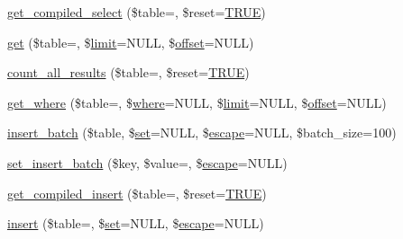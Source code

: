 \begin{DoxyCompactItemize}
\item 
\mbox{\hyperlink{class_c_i___d_b__query__builder_a23325dd8908b76e716e430b4968e3987}{get\+\_\+compiled\+\_\+select}} (\$table=\textquotesingle{}\textquotesingle{}, \$reset=\mbox{\hyperlink{constants_8php_ae04a3efe6aa42044f803ee90c2277846}{T\+R\+UE}})
\item 
\mbox{\hyperlink{class_c_i___d_b__query__builder_a02c629b7cdb54c95ccc23c21d910320d}{get}} (\$table=\textquotesingle{}\textquotesingle{}, \$\mbox{\hyperlink{class_c_i___d_b__query__builder_a875b0d4703f176c36e771d728a9a04a0}{limit}}=N\+U\+LL, \$\mbox{\hyperlink{class_c_i___d_b__query__builder_afd31b65425a2b5cf30711bf29e1b1851}{offset}}=N\+U\+LL)
\item 
\mbox{\hyperlink{class_c_i___d_b__query__builder_a2484516af4a0a9e1d84663d63aa7e505}{count\+\_\+all\+\_\+results}} (\$table=\textquotesingle{}\textquotesingle{}, \$reset=\mbox{\hyperlink{constants_8php_ae04a3efe6aa42044f803ee90c2277846}{T\+R\+UE}})
\item 
\mbox{\hyperlink{class_c_i___d_b__query__builder_a8cae750fdc32b3c91544c091673fd17b}{get\+\_\+where}} (\$table=\textquotesingle{}\textquotesingle{}, \$\mbox{\hyperlink{class_c_i___d_b__query__builder_a2356c4b7b93fb83c62a354a8a0748222}{where}}=N\+U\+LL, \$\mbox{\hyperlink{class_c_i___d_b__query__builder_a875b0d4703f176c36e771d728a9a04a0}{limit}}=N\+U\+LL, \$\mbox{\hyperlink{class_c_i___d_b__query__builder_afd31b65425a2b5cf30711bf29e1b1851}{offset}}=N\+U\+LL)
\item 
\mbox{\hyperlink{class_c_i___d_b__query__builder_ac35c8959b57eb08416e09c094371aaca}{insert\+\_\+batch}} (\$table, \$\mbox{\hyperlink{class_c_i___d_b__query__builder_a1589c46344f3a216a129cf65659b117c}{set}}=N\+U\+LL, \$\mbox{\hyperlink{class_c_i___d_b__driver_ac8f37ca5703d4558c732e692194f8cd6}{escape}}=N\+U\+LL, \$batch\+\_\+size=100)
\item 
\mbox{\hyperlink{class_c_i___d_b__query__builder_a810cdf264ad4b8df2c02c59ad3197859}{set\+\_\+insert\+\_\+batch}} (\$key, \$value=\textquotesingle{}\textquotesingle{}, \$\mbox{\hyperlink{class_c_i___d_b__driver_ac8f37ca5703d4558c732e692194f8cd6}{escape}}=N\+U\+LL)
\item 
\mbox{\hyperlink{class_c_i___d_b__query__builder_a09abce3658cfaba8d8a148c91a9be0ea}{get\+\_\+compiled\+\_\+insert}} (\$table=\textquotesingle{}\textquotesingle{}, \$reset=\mbox{\hyperlink{constants_8php_ae04a3efe6aa42044f803ee90c2277846}{T\+R\+UE}})
\item 
\mbox{\hyperlink{class_c_i___d_b__query__builder_a487027d8e320a1ea657af2d7e61df389}{insert}} (\$table=\textquotesingle{}\textquotesingle{}, \$\mbox{\hyperlink{class_c_i___d_b__query__builder_a1589c46344f3a216a129cf65659b117c}{set}}=N\+U\+LL, \$\mbox{\hyperlink{class_c_i___d_b__driver_ac8f37ca5703d4558c732e692194f8cd6}{escape}}=N\+U\+LL)

\end{DoxyCompactItemize}
